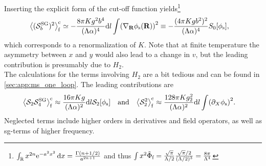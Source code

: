 Inserting the explicit form of the cut-off function yields\footnote{$\int_{\mathbb{R}} x^{2n} \text{e}^{-a^2x^2} \, \mathrm{d}x = \frac{\Gamma(n+1/2)}{a^{2n+1}}$ and thus $\int x^2 \tilde{\Phi}_{\text{f}} = \frac{\sqrt{\pi}}{\Lambda / 2} \frac{\sqrt{\pi} / 2}{(\Lambda / 2)^3} = \frac{8\pi}{\Lambda^4}$}
\begin{align*}
\bra[\big]{(\sact_b^\tsg)^2}_\f^\c &\simeq -\frac{8\pi Kg^2b^4}{(\Lambda\alpha)^4} \d l \int \kla*{\nabla_\textbf{R}\phi_\s(\textbf{R})}^2 \equiv -\frac{(4\pi K gb^2)^2}{(\Lambda\alpha)^4} S_0[\phi_\s],
\end{align*}
which corresponds to a renormalization of $K$.
Note that at finite temperature the asymmetry between $x$ and $y$ would also lead to a change in $v$, but the leading contribution is presumably due to $H_2$.\\
The calculations for the terms involving $H_2$ are a bit tedious and can be found in \autoref{sec:app:ms_one_loop}.
The leading contributions are
\begin{align*}
\bra[\big]{\sact_2 \sact_4^\tsg}_\f^\c &\approx \frac{16\pi K g}{(\Lambda\alpha)^2} \d l \sact_{2}[\phi_\s] \quad \text{and} \quad \bra*{\sact_2^2}_\f^\c \approx \frac{128\pi Kg_2^2}{(\Lambda\alpha)^2} \d l \int \kla*{\partial_X \phi_\s}^2.
\end{align*}
Neglected terms include higher orders in derivatives and field operators, as well as \gls{sg}-terms of higher frequency.
